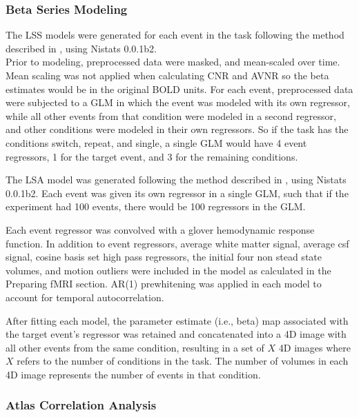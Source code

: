 \documentclass[10pt,letterpaper]{article}
\begin{document}
\subsubsection*{Beta Series Modeling}
\label{methods:bsc_model}

The LSS models were generated for each event in
the task following the method described in \cite{Turner2012a}, using
Nistats 0.0.1b2.\\
Prior to modeling, preprocessed data were masked, and mean-scaled over
time.
Mean scaling was not applied when calculating CNR and AVNR so the
beta estimates would be in the original BOLD units.
For each event, preprocessed data were subjected to a GLM
in which the event was modeled with its own regressor, while
all other events from that condition were modeled in a second regressor,
and other conditions were modeled in their own regressors.
So if the task has the conditions switch, repeat, and single, 
a single GLM would have 4 event regressors, 1 for the target
event, and 3 for the remaining conditions.

The LSA model was generated following the method described in
\cite[Rissman (2004)]{Rissman2004}, using Nistats 0.0.1b2.
Each event was given its own regressor in a single GLM, such that
if the experiment had 100 events, there would be 100 regressors in the GLM.

Each event regressor was convolved with a glover hemodynamic response
function\cite{Glover1999}.
In addition to event regressors, average white matter signal, average csf signal,
cosine basis set high pass regressors, the initial four non stead state volumes, 
and motion outliers were included
in the model as calculated in the Preparing fMRI section.
AR(1) prewhitening was applied in each model to account
for temporal autocorrelation.

After fitting each model, the parameter estimate (i.e., beta) map
associated with the target event's regressor was retained and
concatenated into a 4D image with all other events from the same
condition, resulting in a set of $X$ 4D images where $X$ refers to the
number of conditions in the task.
The number of volumes in each 4D image represents the number of events in that condition.


\subsubsection*{Atlas Correlation Analysis}
\label{methods:atlas-corr-analysis}
\end{document}
